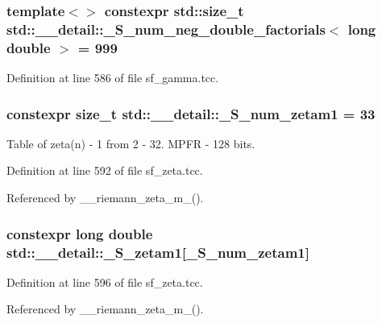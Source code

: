 \subsubsection[{\+\_\+\+S\+\_\+num\+\_\+neg\+\_\+double\+\_\+factorials$<$ long double $>$}]{\setlength{\rightskip}{0pt plus 5cm}template$<$$>$ constexpr std\+::size\+\_\+t {\bf std\+::\+\_\+\+\_\+detail\+::\+\_\+\+S\+\_\+num\+\_\+neg\+\_\+double\+\_\+factorials}$<$ long double $>$ = 999}\label{namespacestd_1_1____detail_a2ef051ec96e521e71489d2327d11c22a}


Definition at line 586 of file sf\+\_\+gamma.\+tcc.

\hypertarget{namespacestd_1_1____detail_a807e36c2aec3a9f27fdb21726cd464e2}{}
\subsubsection[{\+\_\+\+S\+\_\+num\+\_\+zetam1}]{\setlength{\rightskip}{0pt plus 5cm}constexpr size\+\_\+t std\+::\+\_\+\+\_\+detail\+::\+\_\+\+S\+\_\+num\+\_\+zetam1 = 33}\label{namespacestd_1_1____detail_a807e36c2aec3a9f27fdb21726cd464e2}
Table of zeta(n) -\/ 1 from 2 -\/ 32. M\+P\+F\+R -\/ 128 bits. 

Definition at line 592 of file sf\+\_\+zeta.\+tcc.



Referenced by \+\_\+\+\_\+riemann\+\_\+zeta\+\_\+m\+\_().

\hypertarget{namespacestd_1_1____detail_a22ed80d9e5c3bc79e61a3cdb8e79a462}{}
\subsubsection[{\+\_\+\+S\+\_\+zetam1}]{\setlength{\rightskip}{0pt plus 5cm}constexpr long double std\+::\+\_\+\+\_\+detail\+::\+\_\+\+S\+\_\+zetam1\mbox{[}{\bf \+\_\+\+S\+\_\+num\+\_\+zetam1}\mbox{]}}\label{namespacestd_1_1____detail_a22ed80d9e5c3bc79e61a3cdb8e79a462}


Definition at line 596 of file sf\+\_\+zeta.\+tcc.



Referenced by \+\_\+\+\_\+riemann\+\_\+zeta\+\_\+m\+\_().

